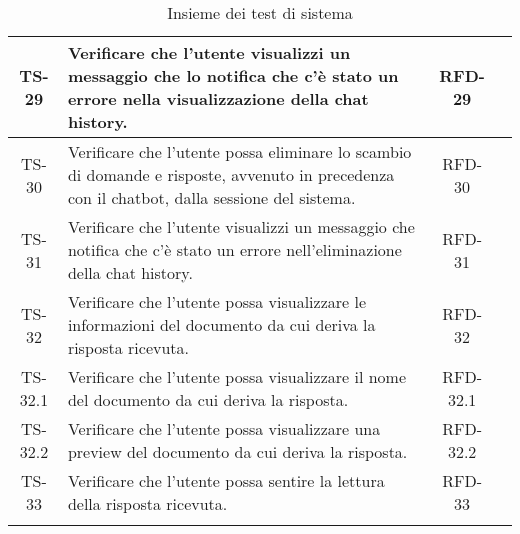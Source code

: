 \begin{xltabular}{\textwidth}{| c | X | c | c |}
    \hline
    TS-29 & Verificare che l'utente visualizzi un messaggio che lo notifica che c'è stato un errore nella visualizzazione della chat history. & RFD-29 & \textcolor{xmarkcolor}{} \\
    \hline
    TS-30 & Verificare che l'utente possa eliminare lo scambio di domande e risposte, avvenuto in precedenza con il chatbot, dalla sessione del sistema. & RFD-30 & \textcolor{xmarkcolor}{} \\
    \hline
    TS-31 & Verificare che l'utente visualizzi un messaggio che notifica che c'è stato un errore nell'eliminazione della chat history. & RFD-31 & \textcolor{xmarkcolor}{} \\
    \hline
    TS-32 & Verificare che l'utente possa visualizzare le informazioni del documento da cui deriva la risposta ricevuta. & RFD-32 & \textcolor{xmarkcolor}{} \\
    \hline
    TS-32.1 & Verificare che l'utente possa visualizzare il nome del documento da cui deriva la risposta. & RFD-32.1 & \textcolor{xmarkcolor}{} \\
    \hline
    TS-32.2 & Verificare che l'utente possa visualizzare una preview del documento da cui deriva la risposta. & RFD-32.2 & \textcolor{xmarkcolor}{} \\
    \hline
    TS-33 & Verificare che l'utente possa sentire la lettura della risposta ricevuta. & RFD-33 & \textcolor{xmarkcolor}{} \\
    \hline
     \caption{Insieme dei test di sistema}
    \label{tab:test}
\end{xltabular}
\endgroup
